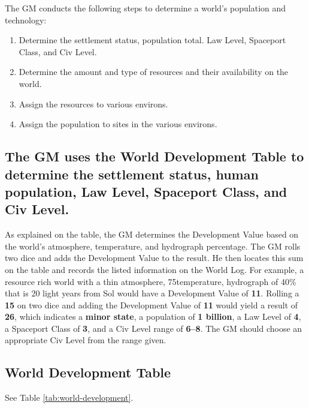 The GM conducts the following steps to determine a world's population
and technology:

\begin{enumerate}
\item Determine the settlement status, population total. Law Level,
  Spaceport Class, and Civ Level.
\item Determine the amount and type of resources and their
  availability on the world.
\item Assign the resources to various environs.
\item Assign the population to sites in the various environs. 
\end{enumerate}

\subsection[World Development]{The GM uses the World
  Development Table to determine the settlement status, human
  population, Law Level, Spaceport Class, and Civ Level.}

As explained on the table, the GM determines the Development Value
based on the world's atmosphere, temperature, and hydrograph
percentage. The GM rolls two dice and adds the Development Value to
the result. He then locates this sum on the table and records the
listed information on the World Log. For example, a resource rich
world with a thin atmosphere, 75\textdegree temperature, hydrograph of
40\% that is 20 light years from Sol would have a Development Value of
\textbf{11}. Rolling a \textbf{15} on two dice and adding the
Development Value of \textbf{11} would yield a result of \textbf{26},
which indicates a \textbf{minor state}, a population of \textbf{1
  billion}, a Law Level of \textbf{4}, a Spaceport Class of
\textbf{3}, and a Civ Level range of \textbf{6--8}. The GM should
choose an appropriate Civ Level from the range given.


\subsection{World Development Table}
\label{sec:world-devel-table}

See Table \vref{tab:world-development}.


